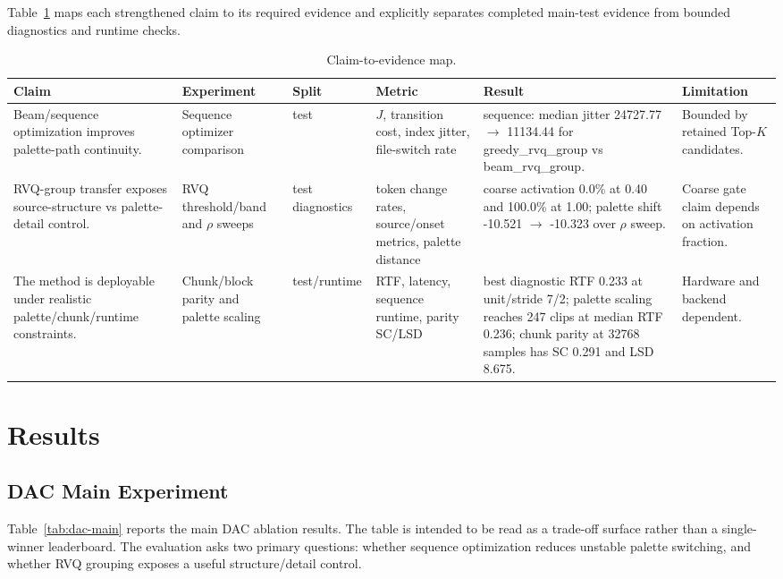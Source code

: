 \documentclass[twoside,a4paper]{article}
\begin{document}
Table~\ref{tab:claim-evidence} maps each strengthened claim to its required evidence and explicitly separates completed main-test evidence from bounded diagnostics and runtime checks.

\begin{table}[t]
\centering
\scriptsize
\setlength{\tabcolsep}{3pt}
\begin{tabular}{p{}p{}p{}p{}p{}p{}}
\toprule
Claim & Experiment & Split & Metric & Result & Limitation \\
\midrule
Beam/sequence optimization improves palette-path continuity. & Sequence optimizer comparison & test & $J$, transition cost, index jitter, file-switch rate & sequence: median jitter 24727.77 $\rightarrow$ 11134.44 for greedy\_rvq\_group vs beam\_rvq\_group. & Bounded by retained Top-$K$ candidates. \\
RVQ-group transfer exposes source-structure vs palette-detail control. & RVQ threshold/band and $\rho$ sweeps & test diagnostics & token change rates, source/onset metrics, palette distance & coarse activation 0.0\% at 0.40 and 100.0\% at 1.00; palette shift -10.521 $\rightarrow$ -10.323 over $\rho$ sweep. & Coarse gate claim depends on activation fraction. \\
The method is deployable under realistic palette/chunk/runtime constraints. & Chunk/block parity and palette scaling & test/runtime & RTF, latency, sequence runtime, parity SC/LSD & best diagnostic RTF 0.233 at unit/stride 7/2; palette scaling reaches 247 clips at median RTF 0.236; chunk parity at 32768 samples has SC 0.291 and LSD 8.675. & Hardware and backend dependent. \\
\bottomrule
\end{tabular}
\caption{Claim-to-evidence map.}
\label{tab:claim-evidence}
\end{table}

\section{Results}\label{sec:results}

\subsection{DAC Main Experiment}

Table~\ref{tab:dac-main} reports the main DAC ablation results. The table is intended to be read as a trade-off surface rather than a single-winner leaderboard. The evaluation asks two primary questions: whether sequence optimization reduces unstable palette switching, and whether RVQ grouping exposes a useful structure/detail control.
\end{document}
